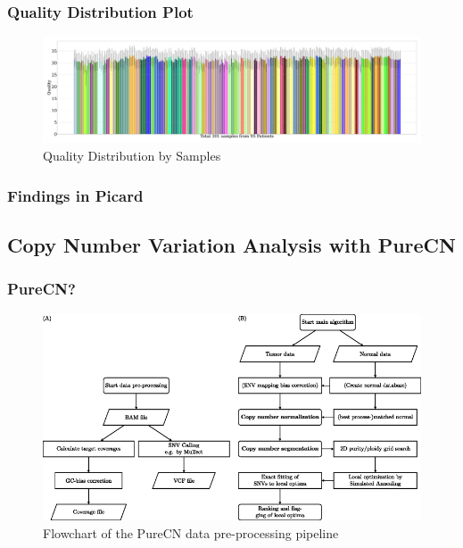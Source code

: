 \documentclass{beamer}
\begin{document}
    \begin{frame}
        \frametitle{Quality Distribution Plot}

        \begin{figure}
            \includegraphics[width=\linewidth]{figures/CollectMultipleMetrics/BWA.pdf}
            \caption{Quality Distribution by Samples}
        \end{figure}
    \end{frame}

    \begin{frame}
        \frametitle{Findings in Picard}
    \end{frame}

    \subsection{Copy Number Variation Analysis with PureCN}
     \begin{frame}
        \frametitle{PureCN?}

        \begin{figure}
            \includegraphics[width=0.6 \linewidth]{figures/Workflow/pureCN.jpg}
            \caption{Flowchart of the PureCN data pre-processing pipeline \protect\cite{pureCN1}}
        \end{figure}
    \end{frame}
\end{document}
